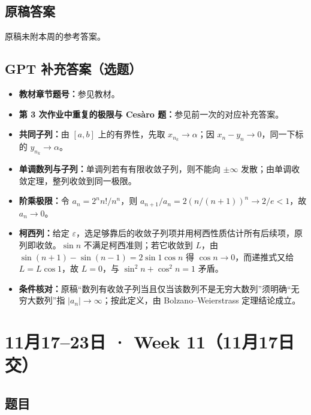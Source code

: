 \documentclass[UTF8,11pt, a4paper, oneside, fontset=none]{ctexbook}
\begin{document}
\subsection*{原稿答案}
\noindent 原稿未附本周的参考答案。
\clearpage
\subsection*{GPT 补充答案（选题）}
\begin{itemize}
\item \textbf{教材章节题号：}参见教材。
\item \textbf{第 3 次作业中重复的极限与 Cesàro 题：}参见前一次的对应补充答案。
\item \textbf{共同子列：}由 $[a,b]$ 上的有界性，先取 $x_{n_k}\to\alpha$；因 $x_n-y_n\to0$，同一下标的 $y_{n_k}\to\alpha$。
\item \textbf{单调数列与子列：}单调列若有有限收敛子列，则不能向 $\pm\infty$ 发散；由单调收敛定理，整列收敛到同一极限。
\item \textbf{阶乘极限：}令 $a_n=2^nn!/n^n$，则 $a_{n+1}/a_n=2(n/(n+1))^n\to2/e<1$，故 $a_n\to0$。
\item \textbf{柯西列：}给定 $\varepsilon$，选足够靠后的收敛子列项并用柯西性质估计所有后续项，原列即收敛。$\sin n$ 不满足柯西准则；若它收敛到 $L$，由 $\sin(n+1)-\sin(n-1)=2\sin1\cos n$ 得 $\cos n\to0$，而递推式又给 $L=L\cos1$，故 $L=0$，与 $\sin^2n+\cos^2n=1$ 矛盾。
\item \textbf{条件核对：}原稿“数列有收敛子列当且仅当该数列不是无穷大数列”须明确“无穷大数列”指 $|a_n|\to\infty$；按此定义，由 Bolzano--Weierstrass 定理结论成立。
\end{itemize}
\clearpage
\section{11月17--23日 · Week 11（11月17日交）}
\subsection*{题目}
\end{document}
